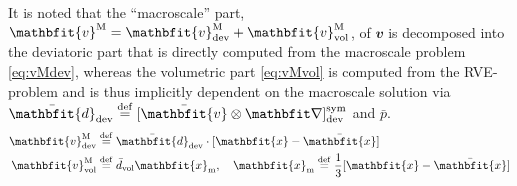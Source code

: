 \documentclass[10pt,a4paper]{article}
\renewcommand{\ta}[1]{\mathbfit{#1}}
\renewcommand{\ts}[1]{\mathbfit{#1}}
\renewcommand{\Box}{\mdlgwhtsquare}
\newcommand{\particle}{\mathrm{part}}
\newcommand{\segment}{\mathrm{segm}}
\newcommand{\corner}{\mathrm{corn}}
\begin{document}

It is noted that the ``macroscale'' part, $\ta{v}^\macro=\ta{v}^\macro_\dev+\ta{v}^\macro_\vol$, of $\ta{v}$ is decomposed into the deviatoric part that is directly computed from the macroscale problem \eqref{eq:vMdev}, whereas the volumetric part \eqref{eq:vMvol}
is computed from the RVE-problem and is thus implicitly dependent on the macroscale solution via $\bar{\ts d}_\dev\defeq[\bar{\ta v}\outerp\diff]^\sym_\dev$ and $\bar{p}$.
\begin{align}
 \label{eq:vMdev} \ta{v}^\macro_\dev &\defeq \bar{\ts d}_\dev\cdot[\ta{x}-\bar{\ta{x}}]\\
 \label{eq:vMvol} \ta{v}^\macro_\vol &\defeq \bar{d}_\vol\ta{x}_\mean,\quad \ta{x}_\mean \defeq \frac13[\ta x-\bar{\ta x}]
\end{align}
\end{document}
